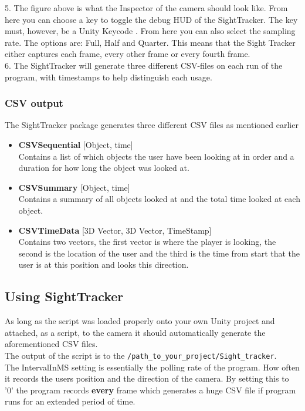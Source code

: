 \documentclass[letterpaper]{article}
\begin{document}
\begin{itemize}
5. The figure above is what the Inspector of the camera should look like. From here you can choose a key to toggle the debug HUD of the SightTracker. The key must, however, be a Unity Keycode \cite{unitykeycode}. From here you can also select the sampling rate. The options are: Full, Half and Quarter. This means that the Sight Tracker either captures each frame, every other frame or every fourth frame.\\[0.15in]
6. The SightTracker will generate three different CSV-files on each run of the program, with timestamps to help distinguish each usage.
\end{itemize}
\subsubsection{CSV output}
The SightTracker package generates three different CSV files as mentioned earlier\\
\begin{itemize}
\item \textbf{CSVSequential} [Object, time]\\
Contains a list of which objects the user have been looking at in order and a duration for how long the object was looked at.
\item \textbf{CSVSummary} [Object, time]\\
Contains a summary of all objects looked at and the total time looked at each object.
\item \textbf{CSVTimeData} [3D Vector, 3D Vector, TimeStamp]\\
Contains two vectors, the first vector is where the player is looking, the second is the location of the user and the third is the time from start that the user is at this position and looks this direction.
\end{itemize}
\pagebreak
\subsection{Using SightTracker}
As long as the script was loaded properly onto your own Unity project and attached, as a script, to the camera it should automatically generate the aforementioned CSV files.\\
The output of the script is to the \texttt{/path\_to\_your\_project/Sight\_tracker}.\\
The IntervalInMS setting is essentially the polling rate of the program. How often it records the users position and the direction of the camera. By setting this to '0' the program records \textbf{every} frame which generates a huge CSV file if program runs for an extended period of time.
\end{document}
